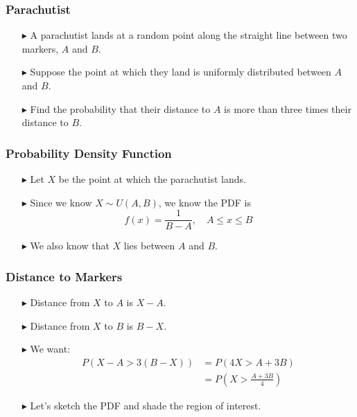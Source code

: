 \documentclass[12pt]{beamer}
\begin{document}
\begin{frame}
	\frametitle{Parachutist}
	
	\begin{itemize}
		\item[\color{blue}$\blacktriangleright$] A parachutist lands at a random point along the straight line between two markers, $A$ and $B$.
		\item[\color{blue}$\blacktriangleright$] Suppose the point at which they land is uniformly distributed between $A$ and $B$.
		\item[\color{blue}$\blacktriangleright$] Find the probability that their distance to $A$ is more than three times their distance to $B$.
	\end{itemize}
	
\end{frame}

\begin{frame}
	\frametitle{Probability Density Function}
	
	\begin{itemize}
		\item[\color{blue}$\blacktriangleright$] Let $X$ be the point at which the parachutist lands.
		\item[\color{blue}$\blacktriangleright$] Since we know $X\sim U(A,B)$, we know the PDF is
		$$f(x)=\frac{1}{B-A},\quad A\le x\le B$$
		\item[\color{blue}$\blacktriangleright$] We also know that $X$ lies between $A$ and $B$.
	\end{itemize}
	
\end{frame}
\begin{frame}
	\frametitle{Distance to Markers}
	
	\begin{itemize}
		\item[\color{blue}$\blacktriangleright$] Distance from $X$ to $A$ is $X - A$.
		
		\item[\color{blue}$\blacktriangleright$] Distance from $X$ to $B$ is $B - X$.
		
		\item[\color{blue}$\blacktriangleright$] We want:
		\begin{align*}
			P(X - A > 3(B - X)) &= P(4X > A + 3B) \\
			&= P\left(X > \frac{A + 3B}{4}\right)
		\end{align*}
		
		\item[\color{blue}$\blacktriangleright$] Let's sketch the PDF and shade the region of interest.
	\end{itemize}
	
	
\end{frame}
\end{document}
